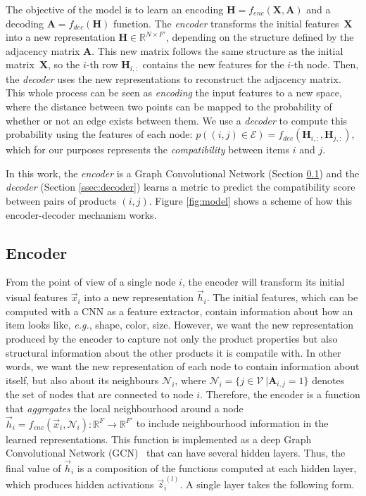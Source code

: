 \documentclass[10pt,twocolumn,letterpaper]{article}
\begin{document}
The objective of the model is to learn an encoding $\boldsymbol{H} = f_{enc}(\boldsymbol{X}, \boldsymbol{A})$ and a decoding ${\boldsymbol{A} = f_{dec}(\boldsymbol{H})}$ function. The \emph{encoder} transforms the initial features~$\boldsymbol{X}$ into a new representation $\boldsymbol{H} \in \mathbb{R}^{N \times F'}$, depending on the structure defined by the adjacency matrix $\boldsymbol{A}$. This new matrix follows the same structure as the initial matrix~$\boldsymbol{X}$, so the $i$-th row $\boldsymbol{H}_{i, :}$ contains the new features for the $i$-th node. Then, the \emph{decoder} uses the new representations to reconstruct the adjacency matrix. This whole process can be seen as \emph{encoding} the input features to a new space, where the distance between two points can be mapped to the probability of whether or not an edge exists between them.
We use a \emph{decoder} to compute this probability using the features of each node: $p((i, j) \in \mathcal{E}) = f_{dec}(\boldsymbol{H}_{i,:}, \boldsymbol{H}_{j,:})$, which for our purposes represents the \emph{compatibility} between items $i$ and $j$.



In this work, the \emph{encoder} is a Graph Convolutional Network (Section \ref{ssec:encoder}) and the \emph{decoder} (Section \ref{ssec:decoder}) learns a metric to predict the compatibility score between pairs of products $(i,j)$. Figure \ref{fig:model} shows a scheme of how this encoder-decoder mechanism works.


\subsection{Encoder}
\label{ssec:encoder}
From the point of view of a single node $i$, the encoder will transform its initial visual features $\vec{x}_i$ into a new representation $\vec{h}_i$. The initial features, which can be computed with a CNN as a feature extractor, contain information about how an item looks like, \textit{e.g.}, shape, color, size. However, we want the new representation produced by the encoder to capture not only the product properties but also structural information about the other products it is compatile with. In other words, we want the new representation of each node to contain information about itself, but also about its neighbours $\mathcal{N}_i$, where $\mathcal{N}_i = \{j \in \mathcal{V}\ | \boldsymbol{A}_{i,j} = 1\}$ denotes the set of nodes that are connected to node $i$. Therefore, the encoder is a function that \emph{aggregates} the local neighbourhood around a node $\vec{h}_i = f_{enc}(\vec{x}_i, \mathcal{N}_i) : \mathbb{R}^F  \rightarrow \mathbb{R}^{F'}$ to include neighbourhood information in the learned representations. This function is implemented as a deep Graph Convolutional Network (GCN)~\cite{kipf2016semi} that can have several hidden layers. 
Thus, the final value of $\vec{h}_i$ is a composition of the functions computed at each hidden layer, which produces hidden activations $\vec{z}_i^{\,(l)}$. A single layer takes the following form.
\end{document}
